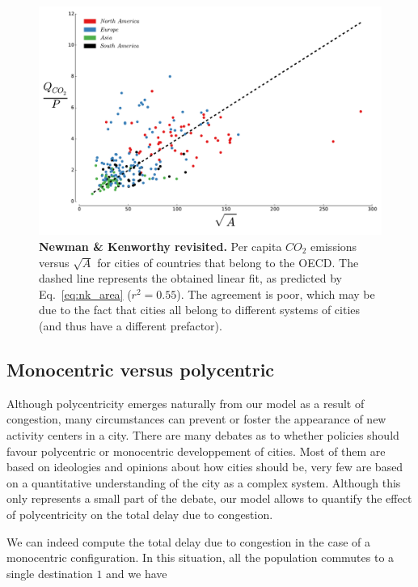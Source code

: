 \begin{figure}
    \centering
    \includegraphics[width=\textwidth]{gfx/chapter-scaling/nk_model.pdf}
    \caption{{\bf Newman \& Kenworthy revisited.} Per capita $CO_2$ emissions versus $\sqrt{A}$ for cities of
    countries that belong to the OECD. The dashed line represents the obtained
linear fit, as predicted by Eq.~\ref{eq:nk_area} ($r^2=0.55$). The agreement is
poor, which may be due to the fact that cities all belong to different systems
of cities (and thus have a different prefactor).\label{fig:nk_model}}
\end{figure}

\subsection{Monocentric versus polycentric}

Although polycentricity emerges naturally from our model as a result of
congestion, many circumstances can prevent or foster the appearance of new
activity centers in a city. There are many debates as to whether policies should
favour polycentric or monocentric developpement of cities. Most of them are
based on ideologies and opinions about how cities should be, very few are based
on a quantitative understanding of the city as a complex system. Although this
only represents a small part of the debate, our model allows to quantify the
effect of polycentricity on the total delay due to congestion.

We can indeed compute the total delay due to congestion in the case of a
monocentric configuration. In this situation, all the population commutes to a
single destination $1$ and we have

